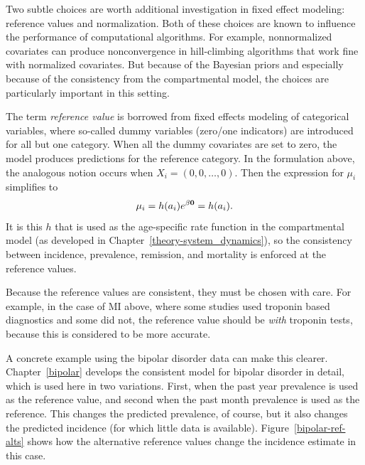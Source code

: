 Two subtle choices are worth additional investigation in fixed effect
modeling: reference values and normalization.  Both of these choices
are known to influence the performance of computational
algorithms.\cite{gelman_bayesian_2003} For example, nonnormalized covariates can produce
nonconvergence in hill-climbing algorithms that work fine with
normalized covariates.  But because of the Bayesian priors and
especially because of the consistency from the compartmental model,
the choices are particularly important in this setting.

The term \emph{reference value} is borrowed from fixed effects
modeling of categorical variables, where so-called dummy variables
(zero/one indicators) are introduced for all but one category. When
all the dummy covariates are set to zero, the model produces
predictions for the reference category. In the formulation above, the
analogous notion occurs when $X_i = (0, 0, \ldots, 0)$.  Then the
expression for $\mu_i$ simplifies to
\[
\mu_i = h(a_i) e^{\beta \mathbf{0}} = h(a_i).
\]
It is this $h$ that is used as the age-specific rate function in
the compartmental model (as developed in
Chapter~\ref{theory-system_dynamics}), so the consistency between
incidence, prevalence, remission, and mortality is enforced at the
reference values.

Because the reference values are consistent, they must be chosen with
care.  For example, in the case of MI above, where some studies used
troponin based diagnostics and some did not, the reference value
should be \emph{with} troponin tests, because this is considered to be
more accurate.

A concrete example using the bipolar disorder data can make this
clearer.  Chapter~\ref{bipolar} develops the consistent model for
bipolar disorder in detail, which is used here in two variations.
First, when the past year prevalence is used as the reference
value, and second when the past month prevalence is used as the
reference.  This changes the predicted prevalence, of course, but it
also changes the predicted incidence (for which little data is
available).  Figure~\ref{bipolar-ref-alts} shows how the alternative
reference values change the incidence estimate in this case.



